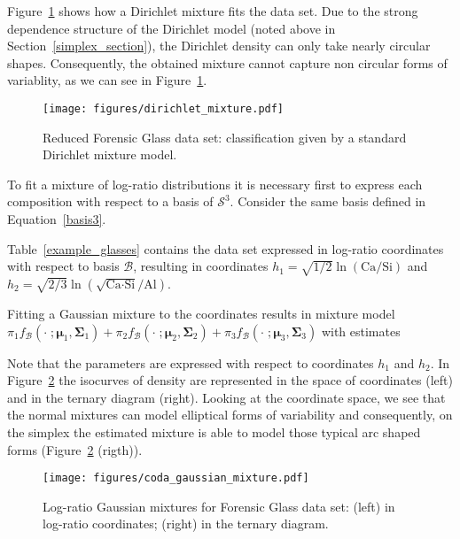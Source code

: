 \documentclass[12pt, a4paper]{article}
\newcommand{\m}[1]{\boldsymbol{#1}}
\begin{document}
Figure~\ref{fig06fittingdirichlet} shows how a Dirichlet mixture fits the data set. Due to the strong dependence structure of the Dirichlet model (noted above in Section~\ref{simplex_section}), the Dirichlet density can only take nearly circular shapes. Consequently, the obtained mixture cannot capture non circular forms of variablity, as we can see in Figure~\ref{fig06fittingdirichlet}.

\begin{figure}[htbp]
\centering
\texttt{[image: figures/dirichlet\_mixture.pdf]}
\caption{Reduced Forensic Glass data set: classification given by a standard Dirichlet mixture model.}
\label{fig06fittingdirichlet}
\end{figure}

To fit a mixture of log-ratio distributions it is necessary first to express each composition with respect to a basis of $\mathcal{S}^3$. Consider the same basis defined in Equation~\ref{basis3}.

Table~\ref{example_glasses} contains the data set expressed in log-ratio coordinates with respect to basis $\mathcal{B}$, resulting in coordinates $h_1 = \sqrt{1/2} \ln(\text{Ca}/\text{Si})$ and $h_2 = \sqrt{2/3} \ln(\sqrt{\text{Ca} \cdot \text{Si}} / \text{Al})$.



Fitting a Gaussian mixture to the coordinates results in mixture model
$
\pi_1 f_{\mathcal{B}}(\cdot\;; \m\mu_1, \m\Sigma_1) + \pi_2 f_{\mathcal{B}}(\cdot\;; \m\mu_2, \m\Sigma_2) + \pi_3 f_{\mathcal{B}}(\cdot\;; \m\mu_3, \m\Sigma_3)
$
with estimates

{\small  }

Note that the parameters are expressed with respect to coordinates $h_1$ and $h_2$. In Figure~\ref{fig07fittingcodaGaussian} the isocurves of density are represented in the space
of coordinates (left) and in the ternary diagram (right). Looking at the coordinate space, we see that the normal mixtures can model elliptical forms of variability and consequently, on the simplex the estimated mixture is able to model those typical arc shaped forms (Figure~\ref{fig07fittingcodaGaussian} (rigth)).

\begin{figure}[htbp]
\centering
\texttt{[image: figures/coda\_gaussian\_mixture.pdf]}\\
\caption{Log-ratio Gaussian mixtures for Forensic Glass data set: (left) in log-ratio coordinates; (right) in the ternary diagram.}
\label{fig07fittingcodaGaussian}
\end{figure}
\end{document}
